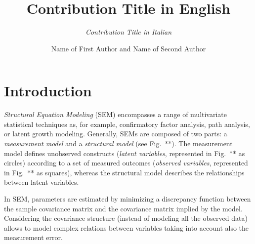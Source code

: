 \documentclass[graybox]{svmult}
\begin{document}
\title*{Contribution Title in English}
\subtitle{\emph{Contribution Title in Italian}}
\author{Name of First Author and Name of Second Author}
%
%
\maketitle


\section{Introduction}
\label{sec:1}

\emph{Structural Equation Modeling} (SEM) encompasses  a range of multivariate statistical techniques as, for example, confirmatory factor analysis, path analysis, or latent growth modeling. Generally, SEMs are composed of two parts: a \emph{measurement model} and a \emph{structural model} (see Fig.~**).   The measurement model defines unobserved constructs (\emph{latent variables}, represented in Fig.~** as circles) according to a set of measured outcomes (\emph{observed variables}, represented in Fig.~** as squares), whereas the structural model describes the relationships between latent variables.

In SEM, parameters are estimated by minimizing a discrepancy function between the sample covariance matrix and the covariance matrix implied by the model. Considering the covariance structure (instead of modeling all the observed data) allows to model complex relations between variables taking into account also the  measurement error.

\end{document}
